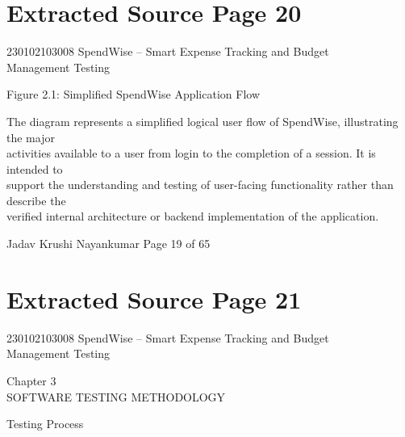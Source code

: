 \documentclass[12pt,a4paper]{report}
\begin{document}
\clearpage
\section*{Extracted Source Page 20}
230102103008                        SpendWise – Smart Expense Tracking and Budget\\ 
Management Testing\\ 

\smallskip

\smallskip

\smallskip

\smallskip
Figure 2.1: Simplified SpendWise Application Flow\\ 

\smallskip

\smallskip
The diagram represents a simplified logical user flow of SpendWise, illustrating the major\\ 
activities available to a user from login to the completion of a session. It is intended to\\ 
support the understanding and testing of user-facing functionality rather than describe the\\ 
verified internal architecture or backend implementation of the application.\\ 

\smallskip

\smallskip

\smallskip

\smallskip
Jadav Krushi Nayankumar                                                    Page 19 of 65\\ 

\clearpage
\section*{Extracted Source Page 21}
230102103008                         SpendWise – Smart Expense Tracking and Budget\\ 
Management Testing\\ 

\smallskip

\smallskip

\smallskip
Chapter 3\\ 

\smallskip
SOFTWARE TESTING METHODOLOGY\\ 

\smallskip

 Testing Process\\ 
\end{document}
